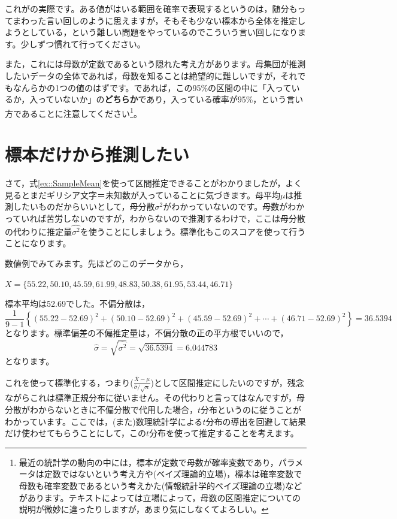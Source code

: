 \documentclass{ltjsbook}
\begin{document}
これがの実際です。ある値がはいる範囲を確率で表現するというのは，随分もってまわった言い回しのように思えますが，そもそも少ない標本から全体を推定しようとしている，という難しい問題をやっているのでこういう言い回しになります。少しずつ慣れて行ってください。

また，これには母数が定数であるという隠れた考え方があります。母集団が推測したいデータの全体であれば，母数を知ることは絶望的に難しいですが，それでもなんらかの1つの値のはずです。であれば，この95\%の区間の中に「入っているか，入っていないか」の\textbf{どちらか}であり，入っている確率が95\%，という言い方であることに注意してください\footnote{最近の統計学の動向の中には，標本が定数で母数が確率変数であり，パラメータは定数ではないという考え方や(ベイズ理論的立場)，標本は確率変数で母数も確率変数であるという考えかた(情報統計学的ベイズ理論の立場)などがあります。テキストによっては立場によって，母数の区間推定についての説明が微妙に違ったりしますが，あまり気にしなくてよろしい。}。

\section{標本だけから推測したい}
さて，式\ref{ex::SampleMean}を使って区間推定できることがわかりましたが，よく見るとまだギリシア文字＝未知数が入っていることに気づきます。母平均$\mu$は推測したいものだからいいとして，母分散$\sigma^2$がわかっていないのです。母数がわかっていれば苦労しないのですが，わからないので推測するわけで，ここは母分散の代わりに推定量$\hat{\sigma^2}$を使うことにしましょう。標準化もこのスコアを使って行うことになります。

数値例でみてみます。先ほどのこのデータから，
\begin{tcolorbox}
    $X = \{ 55.22, 50.10, 45.59, 61.99, 48.83, 50.38, 61.95, 53.44, 46.71\}$
\end{tcolorbox}
標本平均は52.69でした。不偏分散は，
\[ \frac{1}{9-1}\left\{ (55.22-52.69)^2+(50.10-52.69)^2+(45.59-52.69)^2+\cdots+(46.71-52.69)^2 \right\}=36.5394\]
となります。標準偏差の不偏推定量は，不偏分散の正の平方根でいいので，
\[ \hat{\sigma}=\sqrt{\hat{\sigma^2}}= \sqrt{36.5394}=6.044783 \]
となります。

これを使って標準化する，つまり($\frac{\bar{X}-\mu}{\hat{\sigma}/\sqrt{n}}$)として区間推定にしたいのですが，残念ながらこれは標準正規分布に従いません。その代わりと言ってはなんですが，母分散がわからないときに不偏分散で代用した場合，$t$分布というのに従うことがわかっています。ここでは，(また)数理統計学による$t$分布の導出を回避して結果だけ使わせてもらうことにして，この$t$分布を使って推定することを考えます。
\end{document}
